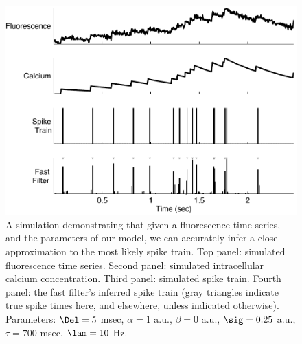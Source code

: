 \begin{figure}
\centering \includegraphics[width=.9\linewidth]{schem}
\caption{A simulation demonstrating that given a fluorescence time series, and the parameters of our model, we can accurately infer a close approximation to the most likely spike train.  Top panel: simulated fluorescence time series.  Second panel: simulated intracellular calcium concentration.  Third panel: simulated spike train. Fourth panel: the fast filter's inferred spike train (gray triangles indicate true spike times here, and elsewhere, unless indicated otherwise).  Parameters: $\Del=5$ msec, $\alpha=1$ a.u., $\beta=0$ a.u., $\sig=0.25$ a.u., $\tau=700$ msec, $\lam=10$ Hz.} \label{fig:schem}
\end{figure}

